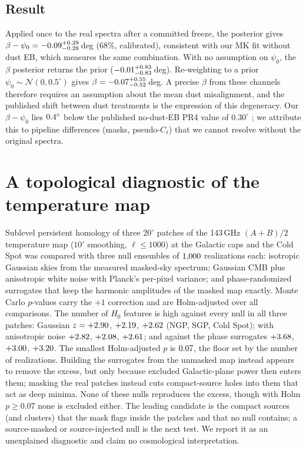 \documentclass[twocolumn]{aastex631}
\begin{document}
\subsection{Result}
Applied once to the real spectra after a committed freeze, the posterior gives
$\beta-\psi_0=-0.09^{+0.29}_{-0.28}$\,deg (68\%, calibrated), consistent with our MK fit without dust EB, which
measures the same combination. With no assumption on $\psi_0$, the $\beta$ posterior returns the
prior ($-0.01^{+0.83}_{-0.83}$\,deg). Re-weighting to a prior
$\psi_0\sim\mathcal N(0,0.5^\circ)$ gives $\beta=-0.07^{+0.55}_{-0.52}$\,deg. A precise
$\beta$ from these channels therefore requires an assumption about the mean dust misalignment, and
the published shift between dust treatments \citep{dp2022} is the expression of this degeneracy.
Our $\beta-\psi_0$ lies $0.4^\circ$ below the published no-dust-EB PR4 value of $0.30^\circ$
\citep{dp2022}; we attribute
this to pipeline differences (masks, pseudo-$C_\ell$) that we cannot resolve without the original
spectra.

\section{A topological diagnostic of the temperature map}
Sublevel persistent homology \citep{coleshiu2018} of three $20^\circ$ patches of the 143\,GHz
$(A+B)/2$ temperature map ($10'$ smoothing, $\ell\le1000$) at the Galactic caps and the Cold Spot
was compared with three null ensembles of $1{,}000$ realizations each: isotropic Gaussian skies from
the measured masked-sky spectrum; Gaussian CMB plus anisotropic white noise with Planck's
per-pixel variance; and phase-randomized surrogates that keep the harmonic amplitudes of the
masked map exactly. Monte Carlo $p$-values carry the $+1$ correction and are Holm-adjusted over all
comparisons. The number of $H_0$ features is high against every null in all three patches:
Gaussian $z=+2.90$, $+2.19$, $+2.62$ (NGP, SGP, Cold Spot); with anisotropic noise $+2.82$,
$+2.08$, $+2.61$; and against the phase surrogates $+3.68$, $+3.00$, $+3.20$. The smallest
Holm-adjusted $p$ is $0.07$, the floor set by the number of realizations. Building the surrogates
from the unmasked map instead appears to remove the excess, but only because excluded
Galactic-plane power then enters them; masking the real patches instead cuts compact-source holes
into them that act as deep minima. None of these nulls reproduces the excess, though with Holm
$p\geq0.07$ none is excluded either. The leading candidate is the compact sources (and clusters) that the mask
flags inside the patches and that no null contains; a source-masked or source-injected null is the
next test. We report it as an unexplained diagnostic and claim no cosmological interpretation.
\end{document}
